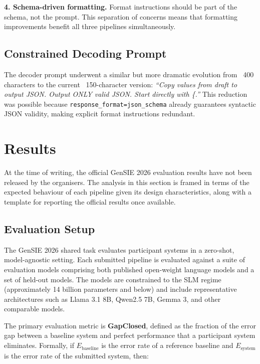 \documentclass[onecolumn]{ceurart}
\begin{document}
\textbf{4. Schema-driven formatting.} Format instructions should be part of the
schema, not the prompt. This separation of concerns means that formatting
improvements benefit all three pipelines simultaneously.

\subsection{Constrained Decoding Prompt}

The decoder prompt underwent a similar but more dramatic evolution from ~400
characters to the current ~150-character version:
\emph{``Copy values from draft to output JSON. Output ONLY valid JSON. Start
directly with \{.''} This reduction was possible because
\texttt{response\_format=json\_schema} already guarantees syntactic JSON
validity, making explicit format instructions redundant.


\section{Results}
\label{sec:results}

At the time of writing, the official GenSIE 2026 evaluation results have not
been released by the organisers. The analysis in this section is framed in terms
of the expected behaviour of each pipeline given its design characteristics,
along with a template for reporting the official results once available.

\subsection{Evaluation Setup}

The GenSIE 2026 shared task evaluates participant systems in a zero-shot,
model-agnostic setting. Each submitted pipeline is evaluated against a suite of
evaluation models comprising both published open-weight language models and a
set of held-out models. The models are constrained to the SLM regime
(approximately 14 billion parameters and below) and include representative
architectures such as Llama 3.1 8B, Qwen2.5 7B, Gemma 3, and other comparable
models.

The primary evaluation metric is \textbf{GapClosed}, defined as the fraction of
the error gap between a baseline system and perfect performance that a
participant system eliminates. Formally, if $E_{\text{baseline}}$ is the error
rate of a reference baseline and $E_{\text{system}}$ is the error rate of the
submitted system, then:
\end{document}
